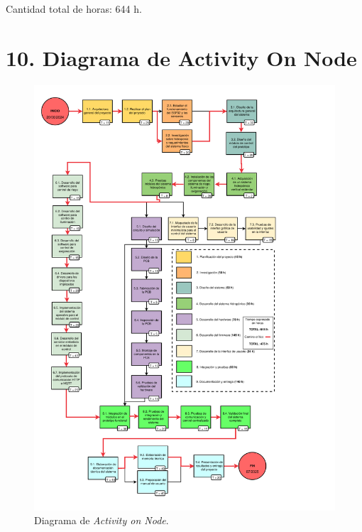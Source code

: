 \documentclass[
11pt, %
]{charter}
\begin{document}
Cantidad total de horas: 644 h.




\section{10. Diagrama de Activity On Node}
\label{sec:AoN}




\begin{figure}[htpb]
\centering 
\includegraphics[width=1.0\textwidth]{./Figuras/AoN.pdf}
\caption{Diagrama de \textit{Activity on Node}.}
\label{fig:AoN}
\end{figure}
\end{document}
